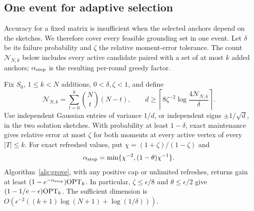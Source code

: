\subsection{One event for adaptive selection}
Accuracy for a fixed matrix is insufficient when the selected anchors
depend on the sketches. We therefore cover every feasible grounding
set in one event. Let $\delta$ be its failure probability and
$\zeta$ the relative moment-error tolerance. The count $\mathcal N_{N,k}$
below includes every active candidate paired with a set of at most
$k$ added anchors; $\alpha_{\rm step}$ is the resulting per-round greedy factor.
\begin{theorem}\label{main:guarantee}
Fix $S_0$, $1\leq k<N$ additions, $0<\delta,\zeta<1$, and define
\[
 \mathcal N_{N,k}=\sum_{t=0}^{k}\binom Nt(N-t),\qquad
 d\geq\left\lceil8\zeta^{-2}\log\frac{4\mathcal N_{N,k}}\delta\right\rceil.
\]
Use independent Gaussian entries of variance $1/d$, or independent
signs $\pm1/\sqrt d$, in the two solution sketches. With probability at least
$1-\delta$, exact maintenance gives relative error at most $\zeta$
for both moments at every active vertex of every $|T|\leq k$.
For exact refreshed values, put $\chi=(1+\zeta)/(1-\zeta)$ and
\[
 \alpha_{\rm step}=\min\{\chi^{-2},(1-\theta)\chi^{-1}\}.
\]
Algorithm~\ref{alg:grove}, with any positive cap or unlimited
refreshes, returns gain at least $(1-e^{-\alpha_{\rm step}})\mathrm{OPT}_k$.
In particular, $\zeta\leq\epsilon/8$ and
$\theta\leq\epsilon/2$ give $(1-1/e-\epsilon)\mathrm{OPT}_k$.
The sufficient dimension is
$O(\epsilon^{-2}((k+1)\log(N+1)+\log(1/\delta)))$.
\end{theorem}
